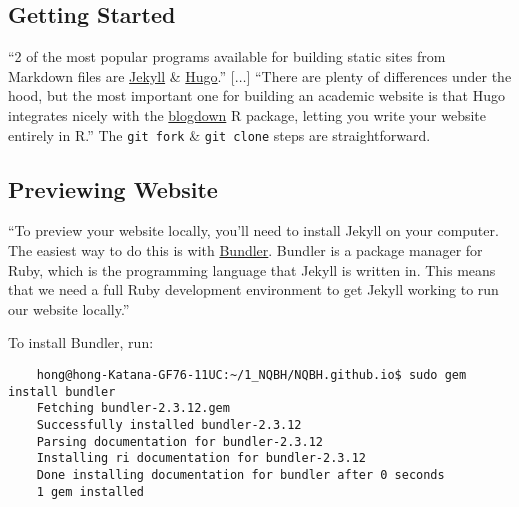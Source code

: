 \documentclass{article}
\numberwithin{equation}{section}
\begin{document}
\subsection{Getting Started}
``2 of the most popular programs available for building static sites from Markdown files are \href{https://jekyllrb.com/}{Jekyll} \& \href{https://gohugo.io/}{Hugo}.'' [$\ldots$] ``There are plenty of differences under the hood, but the most important one for building an academic website is that Hugo integrates nicely with the \href{https://bookdown.org/yihui/blogdown/}{blogdown} R package, letting you write your website entirely in R.'' The \texttt{git fork} \& \texttt{git clone} steps are straightforward.

\subsection{Previewing Website}
``To preview your website locally, you'll need to install Jekyll on your computer. The easiest way to do this is with \href{https://bundler.io/}{Bundler}. Bundler is a package manager for Ruby, which is the programming language that Jekyll is written in. This means that we need a full Ruby development environment to get Jekyll working to run our website locally.''

To install Bundler, run:
\begin{verbatim}
	hong@hong-Katana-GF76-11UC:~/1_NQBH/NQBH.github.io$ sudo gem install bundler
	Fetching bundler-2.3.12.gem
	Successfully installed bundler-2.3.12
	Parsing documentation for bundler-2.3.12
	Installing ri documentation for bundler-2.3.12
	Done installing documentation for bundler after 0 seconds
	1 gem installed
\end{verbatim}
\end{document}
